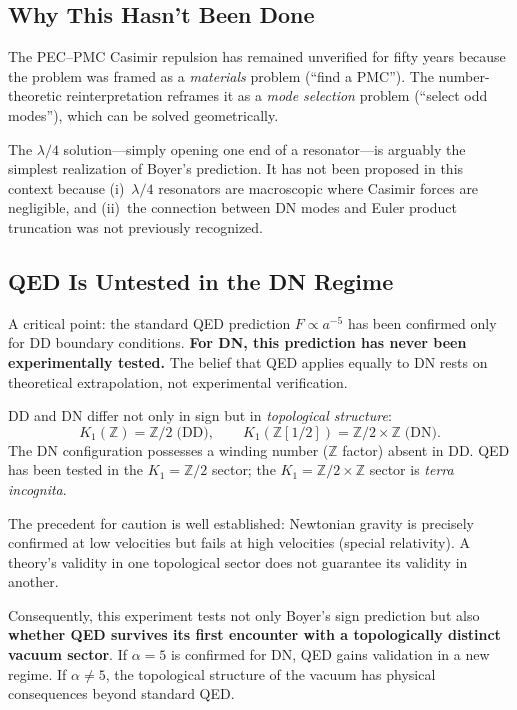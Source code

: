 \documentclass[aps,prd,twocolumn,superscriptaddress,nofootinbib]{revtex4-2}
\begin{document}
\subsection{Why This Hasn't Been Done}

The PEC--PMC Casimir repulsion has remained
unverified for fifty years because the problem was framed as
a \emph{materials} problem (``find a PMC'').  The number-theoretic
reinterpretation reframes it as a \emph{mode selection} problem
(``select odd modes''), which can be solved geometrically.

The $\lambda/4$ solution---simply opening one end of a
resonator---is arguably the simplest realization of Boyer's
prediction.  It has not been proposed in this context because
(i)~$\lambda/4$ resonators are macroscopic where Casimir forces
are negligible, and (ii)~the connection between DN modes and
Euler product truncation was not previously recognized.

\subsection{QED Is Untested in the DN Regime}

A critical point: the standard QED prediction $F\propto a^{-5}$
has been confirmed only for DD boundary conditions.  \textbf{For
DN, this prediction has never been experimentally tested.}
The belief that QED applies equally to DN rests on theoretical
extrapolation, not experimental verification.

DD and DN differ not only in sign but in
\emph{topological structure}:
\begin{equation}
  K_1(\mathbb{Z})=\mathbb{Z}/2 \;\text{(DD)},\qquad
  K_1(\mathbb{Z}[1/2])=\mathbb{Z}/2\times\mathbb{Z}\;\text{(DN)}.
\end{equation}
The DN configuration possesses a winding number ($\mathbb{Z}$
factor) absent in DD.  QED has been tested in the
$K_1=\mathbb{Z}/2$ sector; the $K_1=\mathbb{Z}/2\times\mathbb{Z}$
sector is \emph{terra incognita}.

The precedent for caution is well established: Newtonian gravity
is precisely confirmed at low velocities but fails at high
velocities (special relativity).  A theory's validity in one
topological sector does not guarantee its validity in another.

Consequently, this experiment tests not only Boyer's sign
prediction but also \textbf{whether QED survives its first
encounter with a topologically distinct vacuum sector}.  If
$\alpha=5$ is confirmed for DN, QED gains validation in a new
regime.  If $\alpha\neq 5$, the topological structure of the
vacuum has physical consequences beyond standard QED.
\end{document}
